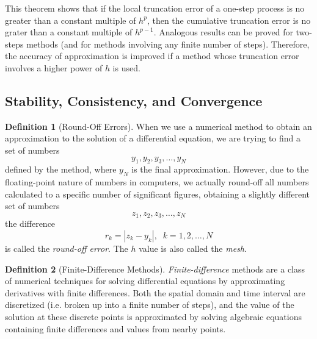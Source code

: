 \documentclass{article}
\theoremstyle{remark}
\theoremstyle{definition}
\newtheorem{definition}{Definition}[section]
\begin{document}
    This theorem shows that if the local truncation error of a one-step process is no greater than a constant multiple of $h^p$, then the cumulative truncation error is no grater than a constant multiple of $h^{p-1}$. Analogous results can be proved for two-steps methods (and for methods involving any finite number of steps). Therefore, the accuracy of approximation is improved if a method whose truncation error involves a higher power of $h$ is used. 

  \subsection{Stability, Consistency, and Convergence}

    \begin{definition}[Round-Off Errors]
    When we use a numerical method to obtain an approximation to the solution of a differential equation, we are trying to find a set of numbers 
    \[y_1, y_2, y_3, \ldots, y_N\]
    defined by the method, where $y_N$ is the final approximation. However, due to the floating-point nature of numbers in computers, we actually round-off all numbers calculated to a specific number of significant figures, obtaining a slightly different set of numbers
    \[z_1, z_2, z_3, \ldots, z_N\]
    the difference
    \[r_k = |z_k - y_k|, \;\; k = 1, 2, \ldots, N\]
    is called the \textit{round-off error}. The $h$ value is also called the \textit{mesh}. 
    \end{definition}

    \begin{definition}[Finite-Difference Methods]
    \textit{Finite-difference} methods are a class of numerical techniques for solving differential equations by approximating derivatives with finite differences. Both the spatial domain and time interval are discretized (i.e. broken up into a finite number of steps), and the value of the solution at these discrete points is approximated by solving algebraic equations containing finite differences and values from nearby points. 
    \end{definition}
\end{document}
